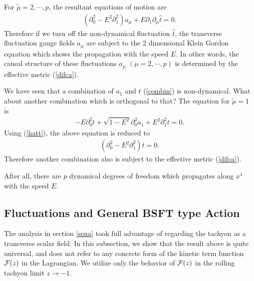 \documentclass[a4paper,12pt]{article}
\newcommand{\p}{\partial}
\begin{document}


For $\widetilde{\mu}= 2, \cdots, p$, the resultant equations of motion
are 
\begin{eqnarray}
\left(\p_0^2  -E^2 \p_1^2\right) a_\mu + E\p_1 \p_\mu \hat{t}=0.
\label{seni}
\end{eqnarray}
Therefore if we turn off the non-dynamical fluctuation $\hat{t}$, the
transverse fluctuation gauge fields $a_\mu$ are subject to the 2
dimensional Klein Gordon equation which shows the propagation with the
speed $E$. In other words, the causal structure of these fluctuations
$a_\mu$ $(\mu = 2, \cdots,p)$ is determined by the effective metric
(\ref{difca}). 

We have seen that a combination of $a_1$ and $t$ (\ref{combin}) is
non-dynamical. What about another combination which is orthogonal to
that? The equation for $\widetilde{\mu}=1$ is 
\begin{eqnarray}
  -E \p_0^2 t + \sqrt{1-E^2}\p_0^2 a_1 + E^2 \p_1^2 t =0.
\end{eqnarray}
Using (\ref{hatt}), the above equation is reduced to
\begin{eqnarray}
\left(\p_0^2  - E^2 \p_1^2\right) t =0.  
\end{eqnarray}
Therefore another combination also is subject to the effective metric
(\ref{difca}). 

After all, there are $p$ dynamical degrees of freedom which
propagates along $x^1$ with the speed $E$.

\subsection{Fluctuations and General BSFT type Action}

The analysis in section \ref{sena} took  full advantage of 
regarding the tachyon as a transverse scalar field. In this subsection, 
we show that the result above is quite universal, and does not refer to
any concrete form of the kinetic term function ${\cal F}(z)$ in
the Lagrangian. We utilize only the behavior of ${\cal F}(z)$ in the
rolling tachyon limit $z \rightarrow -1$. 
\end{document}
